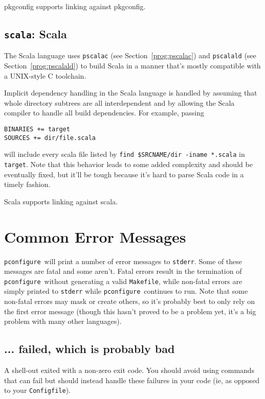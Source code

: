 \documentclass{article}
\newcommand{\pconfigure}{\texttt{pconfigure}}
\begin{document}
pkgconfig supports linking against pkgconfig.

\subsection{\texttt{scala}: Scala \label{lang:scala}}

The Scala language uses \texttt{pscalac} (see
Section~\ref{prog:pscalac}) and \texttt{pscalald} (see
Section~\ref{prog:pscalald}) to build Scala in a manner that's mostly
compatible with a UNIX-style C toolchain.

Implicit dependency handling in the Scala language is handled by
assuming that whole directory subtrees are all interdependent and by
allowing the Scala compiler to handle all build dependencies.  For example, passing
\begin{verbatim}
BINARIES += target
SOURCES += dir/file.scala
\end{verbatim}
will include every scala file listed by \texttt{find \$SRCNAME/dir
  -iname *.scala} in \texttt{target}.  Note that this behavior leads
to some added complexity and should be eventually fixed, but it'll be
tough because it's hard to parse Scala code in a timely fashion.

Scala supports linking against scala.

\section{Common Error Messages \label{err}}

\pconfigure\ will print a number of error messages to \texttt{stderr}.
Some of these messages are fatal and some aren't.  Fatal errors result
in the termination of \pconfigure\ without generating a valid
\texttt{Makefile}, while non-fatal errors are simply printed to
\texttt{stderr} while \pconfigure\ continues to run.  Note that some
non-fatal errors may mask or create others, so it's probably best to
only rely on the first error message (though this hasn't proved to be
a problem yet, it's a big problem with many other languages). %

\subsection{... failed, which is probably bad}

A shell-out exited with a non-zero exit code.  You should avoid using
commands that can fail but should instead handle these failures in
your code (ie, as opposed to your \texttt{Configfile}).
\end{document}
